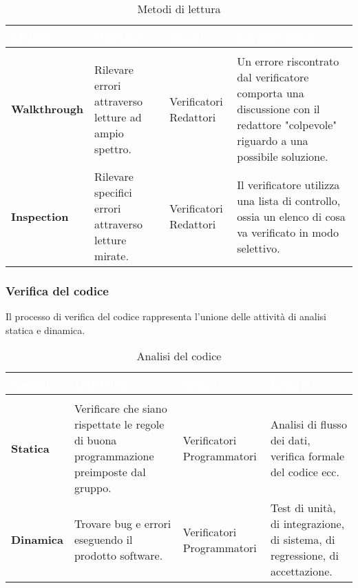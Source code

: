 \renewcommand{\arraystretch}{1.5}
\renewcommand\extrarowheight{1.5pt}
\begin{longtable}{C{3cm} | C{4cm} C{4cm} C{5cm}}
		\textcolor{white}{\textbf{Metodo}} & 
		\textcolor{white}{\textbf{Obiettivo}} & 
		\textcolor{white}{\textbf{Attori}} & 
		\textcolor{white}{\textbf{Caratteristica}} \\
		\endfirsthead
		\\
	    \endfoot
	    \caption{Metodi di lettura}
	    \endlastfoot
		\hline
		\textbf{Walkthrough} & 
		Rilevare errori attraverso letture ad ampio spettro. & 
		Verificatori \newline Redattori & 
		Un errore riscontrato dal verificatore comporta una discussione con il redattore "colpevole" riguardo a una possibile soluzione. \\
		\textbf{Inspection} & 
		Rilevare specifici errori attraverso letture mirate. & 
		Verificatori \newline Redattori & 
		Il verificatore utilizza una lista di controllo, ossia un elenco di cosa va verificato in modo selettivo. \\
\end{longtable}

\subsubsection{Verifica del codice}
Il processo di verifica del codice rappresenta l'unione delle attività di analisi statica e dinamica. 

\renewcommand{\arraystretch}{1.5}
\renewcommand\extrarowheight{1.5pt}
\begin{longtable}{C{3cm} | C{4cm} C{4cm} C{5cm}}
		\textcolor{white}{\textbf{Analisi}} & 
		\textcolor{white}{\textbf{Obiettivo}} & 
		\textcolor{white}{\textbf{Attori}} & 
		\textcolor{white}{\textbf{Esempi}} \\
		\endfirsthead
		\\
	    \endfoot
	    \caption{Analisi del codice}
	    \endlastfoot
		\hline
		\textbf{Statica} & 
		Verificare che siano rispettate le regole di buona programmazione preimposte dal gruppo. & 
		Verificatori \newline Programmatori & 
		Analisi di flusso dei dati, verifica formale del codice ecc. \\
		\textbf{Dinamica} & 
		Trovare bug e errori eseguendo il prodotto software.  & 
		Verificatori \newline Programmatori & 
		Test di unità, di integrazione, di sistema, di regressione, di accettazione. \\
\end{longtable}

